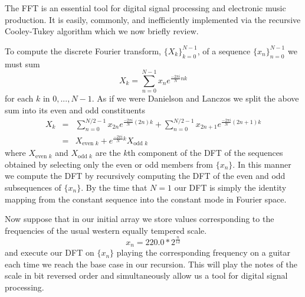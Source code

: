 \documentclass[12pt]{amsart}
\theoremstyle{remark}
\begin{document}
The FFT is an essential tool for digital signal processing and electronic music production. It is easily, commonly, and inefficiently implemented via the recursive Cooley-Tukey algorithm which we now briefly review.

To compute the discrete Fourier transform, $\{ X_k \}_{k=0}^{N-1}$, of a sequence $\{ x_n \}_{n=0}^{N-1}$ we must sum
\begin{equation*}
X_k = \sum_{n=0}^{N-1} x_n e^{\frac{-2 \pi i}{N}nk}
\end{equation*}
for each $k$ in $0, ..., N-1$. As if we were Danielson and Lanczos we split the above sum into its even and odd constituents
\begin{eqnarray*}
X_k &=& \sum_{n=0}^{N/2-1} x_{2n} e^{\frac{-2 \pi i}{N}(2n)k} + \sum_{n=0}^{N/2-1} x_{2n+1} e^{\frac{-2 \pi i}{N}(2n+1)k} \\
&=& X_{\text{even }k} + e^{\frac{-2 \pi i}{N}k} X_{\text{odd }k}
\end{eqnarray*}
where $X_{\text{even }k}$ and $X_{\text{odd }k}$ are the $k$th component of the DFT of the sequences obtained by selecting only the even or odd members from $\{ x_n \}$. In this manner we compute the DFT by recursively computing the DFT of the even and odd subsequences of $\{ x_n \}$. By the time that $N=1$ our DFT is simply the identity mapping from the constant sequence into the constant mode in Fourier space.

Now suppose that in our initial array we store values corresponding to the frequencies of the usual western equally tempered scale.
\begin{equation*}
x_n = 220.0*2^{\frac{n}{12}}
\end{equation*}
and execute our DFT on $\{ x_n \}$ playing the corresponding frequency on a guitar each time we reach the base case in our recursion. This will play the notes of the scale in bit reversed order and simultaneously allow us a tool for digital signal processing.
\end{document}
